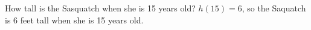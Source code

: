 {How tall is the Sasquatch when she is 15 years old?}
{$h(15) = 6$, so the Saquatch is 6 feet tall when she is 15 years old.}